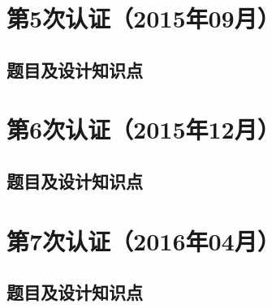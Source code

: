 \documentclass[cn,10pt,math=newtx,citestyle=gb7714-2015,bibstyle=gb7714-2015]{elegantbook}
\begin{document}






\chapter{第5次认证（2015年09月）}

\section{题目及设计知识点}











\chapter{第6次认证（2015年12月）}

\section{题目及设计知识点}

 









\chapter{第7次认证（2016年04月）}

\section{题目及设计知识点}








\end{document}

